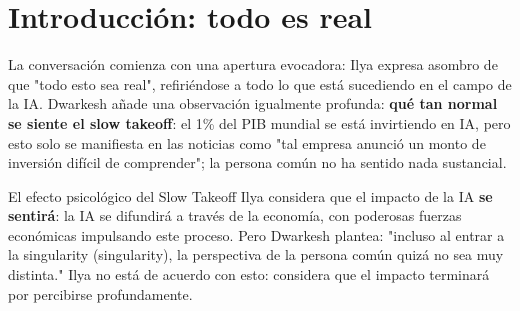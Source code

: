 \section{Introducción: todo es real}

La conversación comienza con una apertura evocadora: Ilya expresa asombro de que "todo esto sea real", refiriéndose a todo lo que está sucediendo en el campo de la IA. Dwarkesh añade una observación igualmente profunda: \textbf{qué tan normal se siente el slow takeoff}: el 1\% del PIB mundial se está invirtiendo en IA, pero esto solo se manifiesta en las noticias como "tal empresa anunció un monto de inversión difícil de comprender"; la persona común no ha sentido nada sustancial.

\begin{knowledgebox}{El efecto psicológico del Slow Takeoff}
Ilya considera que el impacto de la IA \textbf{se sentirá}: la IA se difundirá a través de la economía, con poderosas fuerzas económicas impulsando este proceso. Pero Dwarkesh plantea: "incluso al entrar a la singularity (singularity), la perspectiva de la persona común quizá no sea muy distinta." Ilya no está de acuerdo con esto: considera que el impacto terminará por percibirse profundamente.
\end{knowledgebox}


